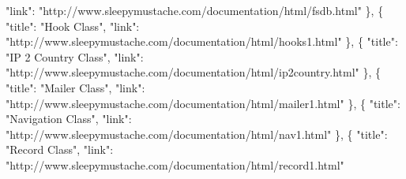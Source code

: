 \begin{DoxyCode}
{      "link": "http://www.sleepymustache.com/documentation/html/fsdb.html"}
\textcolor{stringliteral}{                                                                                          
      \}, \{}
\textcolor{stringliteral}{                                                                                                         
      "title": "Hook Class",}
\textcolor{stringliteral}{                                                                                                         
      "link": "http://www.sleepymustache.com/documentation/html/hooks1.html"}
\textcolor{stringliteral}{                                                                                          
      \}, \{}
\textcolor{stringliteral}{                                                                                                         
      "title": "IP 2 Country Class",}
\textcolor{stringliteral}{                                                                                                         
      "link": "http://www.sleepymustache.com/documentation/html/ip2country.html"}
\textcolor{stringliteral}{                                                                                          
      \}, \{}
\textcolor{stringliteral}{                                                                                                         
      "title": "Mailer Class",}
\textcolor{stringliteral}{                                                                                                         
      "link": "http://www.sleepymustache.com/documentation/html/mailer1.html"}
\textcolor{stringliteral}{                                                                                          
      \}, \{}
\textcolor{stringliteral}{                                                                                                         
      "title": "Navigation Class",}
\textcolor{stringliteral}{                                                                                                         
      "link": "http://www.sleepymustache.com/documentation/html/nav1.html"}
\textcolor{stringliteral}{                                                                                          
      \}, \{}
\textcolor{stringliteral}{                                                                                                         
      "title": "Record Class",}
\textcolor{stringliteral}{                                                                                                         
      "link": "http://www.sleepymustache.com/documentation/html/record1.html"}

\end{DoxyCode}
